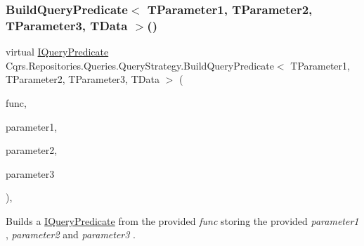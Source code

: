 \subsubsection{\texorpdfstring{Build\+Query\+Predicate$<$ T\+Parameter1, T\+Parameter2, T\+Parameter3, T\+Data $>$()}{BuildQueryPredicate< TParameter1, TParameter2, TParameter3, TData >()}}
{\footnotesize\ttfamily virtual \hyperlink{interfaceCqrs_1_1Repositories_1_1Queries_1_1IQueryPredicate}{I\+Query\+Predicate} Cqrs.\+Repositories.\+Queries.\+Query\+Strategy.\+Build\+Query\+Predicate$<$ T\+Parameter1, T\+Parameter2, T\+Parameter3, T\+Data $>$ (\begin{DoxyParamCaption}\item[{Func$<$ T\+Parameter1, T\+Parameter2, T\+Parameter3, T\+Data $>$}]{func,  }\item[{T\+Parameter1}]{parameter1,  }\item[{T\+Parameter2}]{parameter2,  }\item[{T\+Parameter3}]{parameter3 }\end{DoxyParamCaption})\hspace{0.3cm}{\ttfamily [protected]}, {\ttfamily [virtual]}}



Builds a \hyperlink{interfaceCqrs_1_1Repositories_1_1Queries_1_1IQueryPredicate}{I\+Query\+Predicate} from the provided {\itshape func}  storing the provided {\itshape parameter1} , {\itshape parameter2}  and {\itshape parameter3} . 

\mbox{\label{classCqrs_1_1Repositories_1_1Queries_1_1QueryStrategy_a554a686b6f81c4b8337570b9a4e0c284_a554a686b6f81c4b8337570b9a4e0c284}} 

